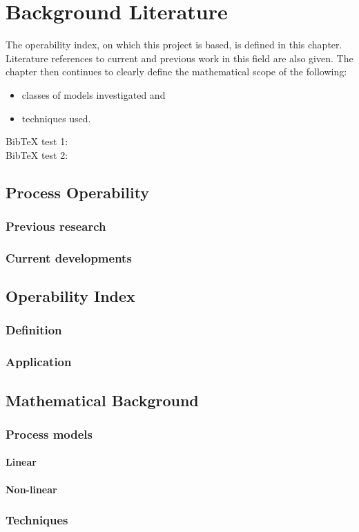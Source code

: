 \chapter{Background Literature}\label{chap:lit}
\begin{overview}
  The operability index, on which this project is based, is defined in this
  chapter. Literature references to current and previous work in this field
  are also given. The chapter then continues to clearly define the
  mathematical scope of the following:
  \begin{itemize}
    \item classes of models investigated and
    \item techniques used.
  \end{itemize}
\end{overview}

BibTeX test 1: \citet{qhull}\\
BibTeX test 2: \citep{qhull}\\

\section{Process Operability}
\subsection{Previous research}
\subsection{Current developments}

\section{Operability Index}
\subsection{Definition}
\subsection{Application}

\section{Mathematical Background}
\subsection{Process models}
\subsubsection{Linear}
\subsubsection{Non-linear}
\subsection{Techniques}
